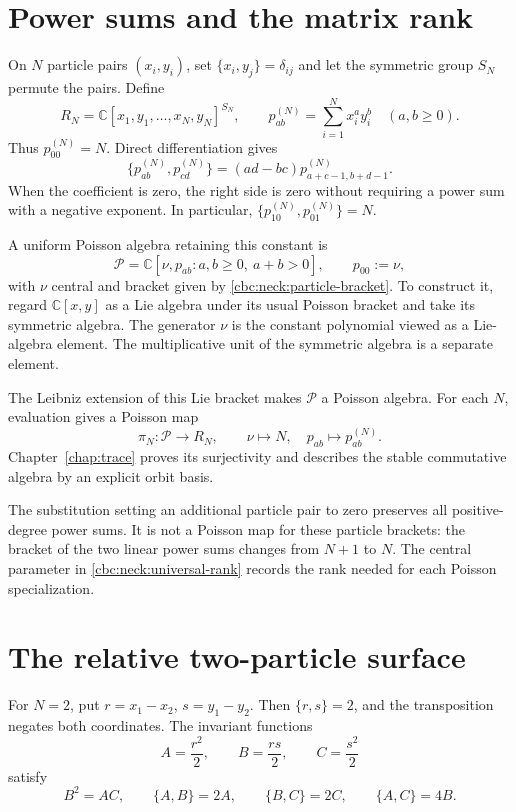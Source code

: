 \section{Power sums and the matrix rank}
On $N$ particle pairs $(x_i,y_i)$, set $\{x_i,y_j\}=\delta_{ij}$ and let
the symmetric group $S_N$ permute the pairs.  Define
\[
 R_N=\mathbb C[x_1,y_1,\ldots,x_N,y_N]^{S_N},\qquad
 p_{ab}^{(N)}=\sum_{i=1}^N x_i^ay_i^b\quad(a,b\geq0).
\]
Thus $p_{00}^{(N)}=N$.  Direct differentiation gives
\begin{equation}\label{cbc:neck:particle-bracket}
 \{p_{ab}^{(N)},p_{cd}^{(N)}\}
 =(ad-bc)p_{a+c-1,b+d-1}^{(N)}.
\end{equation}
When the coefficient is zero, the right side is zero without requiring a
power sum with a negative exponent.  In particular,
$\{p_{10}^{(N)},p_{01}^{(N)}\}=N$.

A uniform Poisson algebra retaining this constant is
\begin{equation}\label{cbc:neck:universal-rank}
 \mathcal P=\mathbb C[\nu,p_{ab}:a,b\geq0,\ a+b>0],
 \qquad p_{00}:=\nu,
\end{equation}
with $\nu$ central and bracket given by \eqref{cbc:neck:particle-bracket}.
To construct it, regard $\mathbb C[x,y]$ as a Lie algebra under its usual
Poisson bracket and take its symmetric algebra.  The generator $\nu$ is the
constant polynomial viewed as a Lie-algebra element.  The multiplicative
unit of the symmetric algebra is a separate element.

The Leibniz extension of this Lie bracket makes $\mathcal P$ a Poisson
algebra.  For each $N$, evaluation gives a Poisson map
\begin{equation}\label{cbc:neck:rank-evaluation}
 \pi_N:\mathcal P\longrightarrow R_N,
 \qquad \nu\longmapsto N,\quad p_{ab}\longmapsto p_{ab}^{(N)}.
\end{equation}
Chapter~\ref{chap:trace} proves its surjectivity and describes the stable
commutative algebra by an explicit orbit basis.

The substitution setting an additional particle pair to zero preserves all
positive-degree power sums.  It is not a Poisson map for these particle
brackets: the bracket of the two linear power sums changes from $N+1$ to
$N$.  The central parameter in \eqref{cbc:neck:universal-rank} records the
rank needed for each Poisson specialization.

\section{The relative two-particle surface}
For $N=2$, put $r=x_1-x_2$, $s=y_1-y_2$.  Then $\{r,s\}=2$, and the
transposition negates both coordinates.  The invariant functions
\[
 A=\frac{r^2}{2},\qquad B=\frac{rs}{2},\qquad C=\frac{s^2}{2}
\]
satisfy
\[
 B^2=AC,\qquad \{A,B\}=2A,\qquad
 \{B,C\}=2C,\qquad \{A,C\}=4B.
\]


